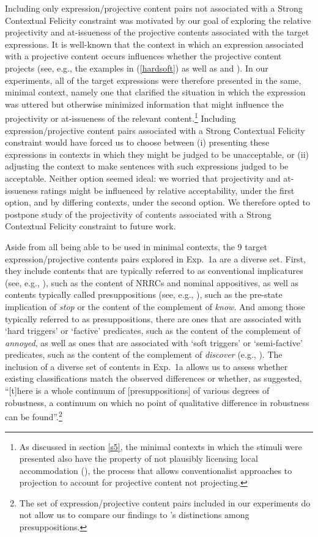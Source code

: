 \documentclass[11pt,fleqn]{article}
\newcommand{\6}{\mbox{$[\hspace*{-.6mm}[$}}
\newcommand{\9}{\mbox{$]\hspace*{-.6mm}]$}}
\newcommand{\citepos}[1]{\citeauthor{#1}'s \citeyear{#1}}
\begin{document}
Including only expression/projective content pairs not associated with a Strong Contextual Felicity constraint was motivated by our goal of exploring the relative projectivity and at-issueness of the projective contents associated with the target expressions. It is well-known that the context in which an expression associated with a projective content occurs influences whether the projective content projects (see, e.g., the examples in (\ref{hardsoft}) as well as \citealt{simons01} and \citealt{beaver-belly}). In our experiments, all of the target expressions were therefore presented in the same, minimal context, namely one that clarified the situation in which the expression was uttered but  otherwise minimized information that might influence the projectivity or at-issueness of the relevant content.\footnote{As discussed in section \ref{s5}, the minimal contexts in which the stimuli were presented also have the property of not plausibly licensing local accommodation (\citealt{heim83,vds92}), the process that allows conventionalist approaches to projection to account for projective content not projecting.} Including expression/projective content pairs associated with a Strong Contextual Felicity constraint would have forced us to choose between (i) presenting these expressions in contexts in which they might be judged to be unacceptable, or (ii) adjusting the context to make sentences with such expressions judged to be acceptable. Neither option seemed ideal: we worried that projectivity and at-issueness ratings might be influenced by relative acceptability, under the first option, and by differing contexts, under the second option. We therefore opted to postpone study of the projectivity of contents associated with a Strong Contextual Felicity constraint to future work.

Aside from all being able to be used in minimal contexts, the 9 target expression/projective contents pairs explored in Exp.~1a are a diverse set. First, they include contents that are typically referred to as conventional implicatures (see, e.g., \citealt{potts05}), such as the content of NRRCs and nominal appositives, as well as contents typically called presuppositions (see, e.g., \citealt{heim83,abrusan2011}), such as the pre-state implication of {\em stop} or the content of the complement of {\em know}. And among those typically referred to as presuppositions, there are ones that are associated with `hard triggers' or `factive' predicates, such as the content of the complement of {\em annoyed}, as well as ones that are associated with `soft triggers' or `semi-factive' predicates, such as the content of the complement of {\em discover} (e.g., \citealt{karttunen71b,simons01,potts05,abusch10,beaver-belly}). The inclusion of a diverse set of contents in Exp.~1a allows us to assess whether  existing classifications match the observed differences or whether, as \citet[223]{kadmon01} suggested, ``[t]here is a whole continuum of [presuppositions] of various degrees of robustness, a continuum on which no point of qualitative difference in robustness can be found''.\footnote{The set of expression/projective content pairs included in our experiments do not allow us to compare our findings to \citepos{zeevat92} distinctions among presuppositions.}
\end{document}
